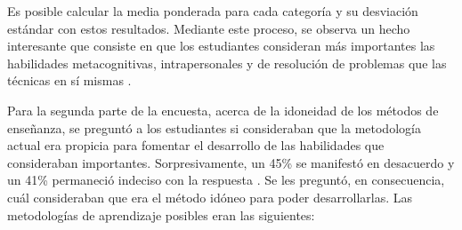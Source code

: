 \documentclass[conference]{IEEEtran}
\begin{document}
Es posible calcular la media ponderada para cada categoría y su desviación estándar con estos resultados. Mediante este proceso, se observa un hecho interesante que consiste en que los estudiantes consideran más importantes las habilidades metacognitivas, intrapersonales y de resolución de problemas que las técnicas en sí mismas \cite{b2}.

Para la segunda parte de la encuesta, acerca de la idoneidad de los métodos de enseñanza, se preguntó a los estudiantes si consideraban que la metodología actual era propicia para fomentar el desarrollo de las habilidades que consideraban importantes. Sorpresivamente, un 45\% se manifestó en desacuerdo y un 41\% permaneció indeciso con la respuesta \cite{b2}. Se les preguntó, en consecuencia, cuál consideraban que era el método idóneo para poder desarrollarlas. Las metodologías de aprendizaje posibles eran las siguientes:
\end{document}

